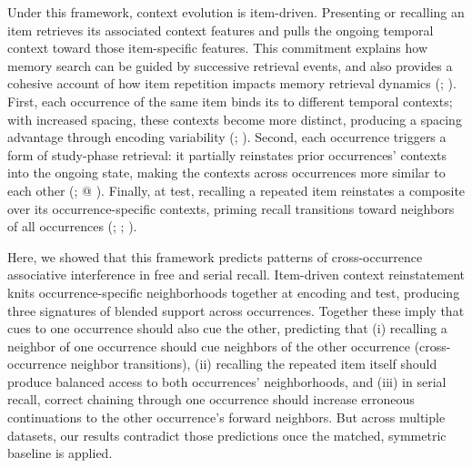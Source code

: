 \documentclass[
  man,
  floatsintext,
  longtable,
  nolmodern,
  notxfonts,
  notimes,
  draftfirst,
  colorlinks=true,linkcolor=blue,citecolor=blue,urlcolor=blue]{apa7}
\begin{document}
Under this framework, context evolution is item-driven. Presenting or
recalling an item retrieves its associated context features and pulls
the ongoing temporal context toward those item-specific features. This
commitment explains how memory search can be guided by successive
retrieval events, and also provides a cohesive account of how item
repetition impacts memory retrieval dynamics
(;
). First, each
occurrence of the same item binds its to different temporal contexts;
with increased spacing, these contexts become more distinct, producing a
spacing advantage through encoding variability
(;
). Second, each
occurrence triggers a form of study-phase retrieval: it partially
reinstates prior occurrences' contexts into the ongoing state, making
the contexts across occurrences more similar to each other
(; @
). Finally, at
test, recalling a repeated item reinstates a composite over its
occurrence-specific contexts, priming recall transitions toward
neighbors of all occurrences (; ;
).

Here, we showed that this framework predicts patterns of
cross-occurrence associative interference in free and serial recall.
Item-driven context reinstatement knits occurrence-specific
neighborhoods together at encoding and test, producing three signatures
of blended support across occurrences. Together these imply that cues to
one occurrence should also cue the other, predicting that (i) recalling
a neighbor of one occurrence should cue neighbors of the other
occurrence (cross-occurrence neighbor transitions), (ii) recalling the
repeated item itself should produce balanced access to both occurrences'
neighborhoods, and (iii) in serial recall, correct chaining through one
occurrence should increase erroneous continuations to the other
occurrence's forward neighbors. But across multiple datasets, our
results contradict those predictions once the matched, symmetric
baseline is applied.
\end{document}
